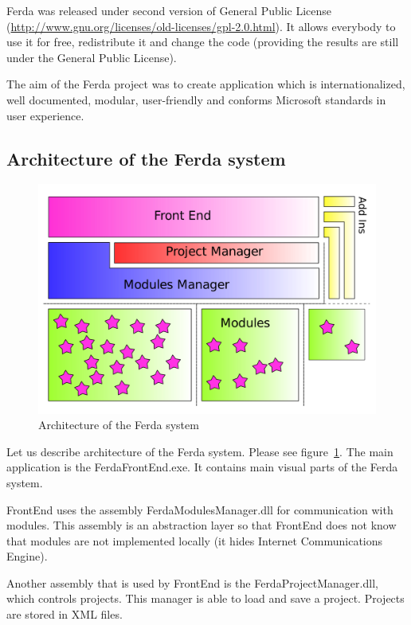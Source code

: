 \documentclass[a4paper,12pt]{book}
\begin{document}
Ferda was released under second version of General Public License (\url{http://www.gnu.org/licenses/old-licenses/gpl-2.0.html}). It allows everybody to use it for free, redistribute it and change the code (providing the results are still under the General Public License).

The aim of the Ferda project was to create application which is internationalized, well documented, modular, user-friendly and conforms Microsoft standards in user experience.

\subsection{Architecture of the Ferda system}
\begin{figure}
	\noindent\includegraphics[width=1\textwidth]{designB}
	\caption{Architecture of the Ferda system}
	\label{fig:architectureFerda}
\end{figure}

Let us describe architecture of the Ferda system. Please see figure~\ref{fig:architectureFerda}. The main application is the FerdaFrontEnd.exe. It contains main visual parts of the Ferda system.

FrontEnd uses the assembly FerdaModulesManager.dll for communication with modules. This assembly is an abstraction layer so that FrontEnd does not know that modules are not implemented locally (it hides Internet Communications Engine).

Another assembly that is used by FrontEnd is the FerdaProjectManager.dll, which controls projects. This manager is able to load and save a project. Projects are stored in XML files.
\end{document}
